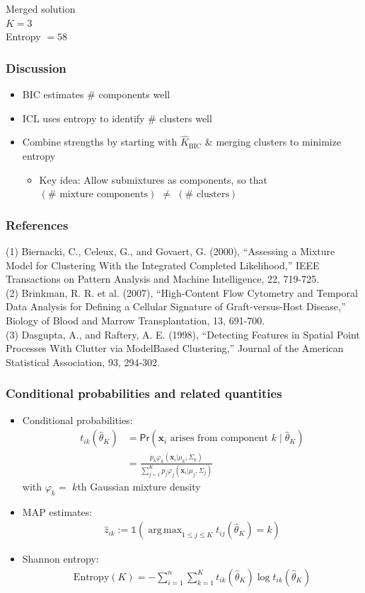 \documentclass[mathserif,compress]{beamer}
\newcommand*\ba{\[ \begin{aligned}}
\newcommand*\ea{\end{aligned} \]}
\newcommand*\ind[1]{\mathbb{1}\left(#1\right)}
\newcommand*\estim[1]{\widehat{#1}}
\DeclareMathOperator*{\argmax}{arg\;max}
\renewcommand\;{\,}
\renewcommand\phi{\varphi}
\renewcommand\Pr[1]{ \mathsf{Pr}\left(#1\right) }
\newcommand{\bx}{\mathbf{x}}
\begin{document}
\begin{frame}
\begin{center}
{\begin{minipage}{0.4\linewidth}
\begin{center}
Merged solution
\\
$K = 3$
\\
Entropy $= 58$
\end{center}
\end{minipage}
}
\end{center}
\end{frame}

\begin{frame}\frametitle{Discussion}
\begin{itemize}
\item[]
BIC estimates \# components well 
\bigskip
\item[]
ICL uses entropy to identify \# clusters well
\bigskip
\item[]
Combine strengths by starting with $\estim K_\text{BIC}$ \& merging clusters to minimize entropy
\bigskip
\begin{itemize}
\item
Key idea: Allow submixtures as components, so that $\left(\# \text{ mixture components}\right)$ 
$\ne$ 
$\left(\# \text{ clusters} \right)$
\end{itemize}
\end{itemize}
\end{frame}

\begin{frame}\frametitle{References}
(1)
Biernacki, C., Celeux, G., and Govaert, G. (2000), ``Assessing a Mixture Model for Clustering With the Integrated
Completed Likelihood,'' IEEE Transactions on Pattern Analysis and Machine Intelligence, 22, 719-725.
\\ \bigskip
(2) Brinkman, R. R. et al. (2007), ``High-Content Flow Cytometry and Temporal Data Analysis for Defining a Cellular Signature of
Graft-versus-Host Disease,'' Biology of Blood and Marrow Transplantation, 13, 691-700.
\\ \bigskip
(3) Dasgupta, A., and Raftery, A. E. (1998), ``Detecting Features in Spatial Point Processes With Clutter via ModelBased
Clustering,'' Journal of the American Statistical Association, 93, 294-302. 
\end{frame}

\begin{frame}\frametitle{Conditional probabilities and related quantities}
\begin{itemize}
\item[]
Conditional probabilities:
\ba
t_{ik}(\estim\theta_K) & = \Pr{\bx_i \text{ arises from component $k$} \mid \estim\theta_K } \\
	& = \frac{ p_k \phi_k(\bx_i | \mu_k, \Sigma_k)  }
 	{ \sum_{j=1}^K p_j \phi_j(\bx_i | \mu_j, \Sigma_j) }
\ea
with $\phi_k = $ $k$th Gaussian mixture density
\medskip
\item[]
MAP estimates:
\ba
\estim z_{ik} := \ind{ \argmax_{1 \le j \le K} t_{ij}(\estim\theta_K) = k }
\ea
\item[]
Shannon entropy:
\ba
\text{Entropy}(K) = - \sum_{i=1}^n \sum_{k=1}^K
	t_{ik}(\estim\theta_K) \log t_{ik}(\estim\theta_K)
\ea
\end{itemize}
\end{frame}
\end{document}

